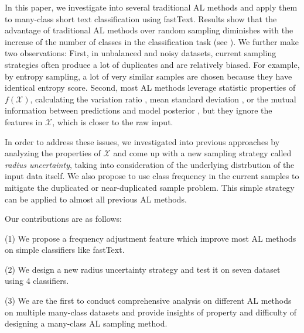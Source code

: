 In this paper, we investigate into several traditional AL methods 
and apply them to many-class short text classification using 
fastText. Results show that the advantage of traditional AL methods 
over random sampling diminishes with the increase of the number 
of classes in the classification task (see ).
We further make two observations:
First, in unbalanced and noisy datasets, current sampling strategies often
produce a lot of duplicates and are relatively biased. 
For example, by entropy sampling, 
a lot of very similar samples are chosen because they have identical entropy score. 
Second, most AL methods leverage statistic properties of $f(\mathcal{X})$, 
calculating the variation ratio \cite{freeman1965elementary}, mean standard deviation \cite{kampffmeyer2016semantic}, or the mutual information between predictions and model posterior \cite{houlsby2011bayesian}, but they ignore the features in $\mathcal{X}$, which is closer
to the raw input.

In order to address these issues, we investigated into previous approaches by 
analyzing the properties of $\mathcal{X}$ and come up with a new
sampling strategy called {\em radius uncertainty}, taking into consideration of 
the underlying distrbution of the input data itself. We also propose to use
class frequency in the current samples to mitigate the duplicated or 
near-duplicated sample problem. This simple strategy can be applied to
almost all previous AL methods.

Our contributions are as follows:

(1) We propose a frequency adjustment feature which improve most AL methods on simple classifiers like fastText.
 
(2) We design a new radius uncertainty strategy and test it on seven dataset using 4 classifiers.
 
(3) We are the first to conduct comprehensive analysis on different AL methods on 
multiple many-class datasets and provide insights of property and difficulty of 
designing a many-class AL sampling method. 
